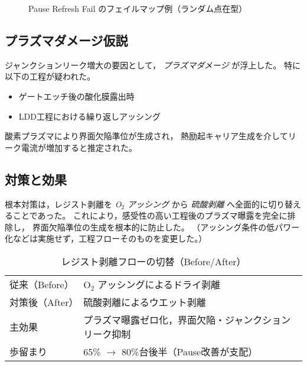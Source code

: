 \documentclass[conference]{IEEEtran}
\begin{document}
\begin{figure}[t]
\centering
{}
\caption{Pause Refresh Fail のフェイルマップ例（ランダム点在型）}
\label{fig:failmap}
\end{figure}

\subsection{プラズマダメージ仮説}
ジャンクションリーク増大の要因として，
\emph{プラズマダメージ} が浮上した。
特に以下の工程が疑われた。
\begin{itemize}
  \item ゲートエッチ後の酸化膜露出時
  \item LDD工程における繰り返しアッシング
\end{itemize}
酸素プラズマにより界面欠陥準位が生成され，
熱励起キャリア生成を介してリーク電流が増加すると推定された。

\subsection{対策と効果}
根本対策は，レジスト剥離を \emph{O$_2$ アッシング} から
\emph{硫酸剥離} へ全面的に切り替えることであった。
これにより，感受性の高い工程後のプラズマ曝露を完全に排除し，
界面欠陥準位の生成を根本的に防止した。
（アッシング条件の低パワー化などは実施せず，工程フローそのものを変更した。）

\begin{table}[t]
  \centering
  \caption{レジスト剥離フローの切替（Before/After）}
  \begin{tabular}{ll}
    \toprule
    従来（Before） & O$_2$ アッシングによるドライ剥離 \\
    対策後（After） & 硫酸剥離によるウエット剥離 \\
    主効果 & プラズマ曝露ゼロ化，界面欠陥・ジャンクションリーク抑制 \\
    歩留まり & 65\% $\rightarrow$ 80\%台後半（Pause改善が支配） \\
    \bottomrule
  \end{tabular}
\end{table}
\end{document}
